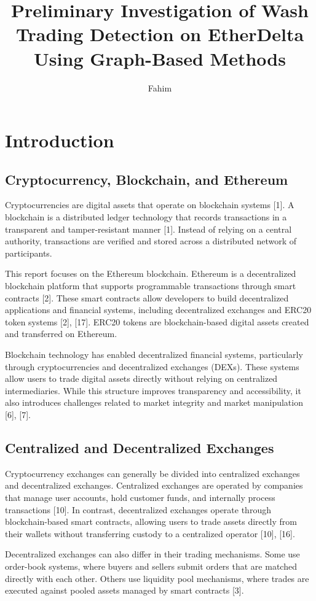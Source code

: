 \documentclass[language=english,thesis=bachelor,nosecondtitle,faculty=cb,onesided,12pt]{hsmw-thesis}
\title{Preliminary Investigation of Wash Trading Detection on EtherDelta Using Graph-Based Methods}
\author{Fahim}{Rafique}[B.Sc.]
\begin{document}
\chapter{Introduction}
	\section{Cryptocurrency, Blockchain, and Ethereum}		
Cryptocurrencies are digital assets that operate on blockchain systems [1]. A blockchain is a distributed ledger technology that records transactions in a transparent and tamper-resistant manner [1]. Instead of relying on a central authority, transactions are verified and stored across a distributed network of participants. 

This report focuses on the Ethereum blockchain. Ethereum is a decentralized blockchain platform that supports programmable transactions through smart contracts [2]. These smart contracts allow developers to build decentralized applications and financial systems, including decentralized exchanges and ERC20 token systems [2], [17]. ERC20 tokens are blockchain-based digital assets created and transferred on Ethereum. 

Blockchain technology has enabled decentralized financial systems, particularly through cryptocurrencies and decentralized exchanges (DEXs). These systems allow users to trade digital assets directly without relying on centralized intermediaries. While this structure improves transparency and accessibility, it also introduces challenges related to market integrity and market manipulation [6], [7].

	\section{Centralized and Decentralized Exchanges}
Cryptocurrency exchanges can generally be divided into centralized exchanges and decentralized exchanges. Centralized exchanges are operated by companies that manage user accounts, hold customer funds, and internally process transactions [10]. In contrast, decentralized exchanges operate through blockchain-based smart contracts, allowing users to trade assets directly from their wallets without transferring custody to a centralized operator [10], [16].

Decentralized exchanges can also differ in their trading mechanisms. Some use order-book systems, where buyers and sellers submit orders that are matched directly with each other. Others use liquidity pool mechanisms, where trades are executed against pooled assets managed by smart contracts [3].
\end{document}
